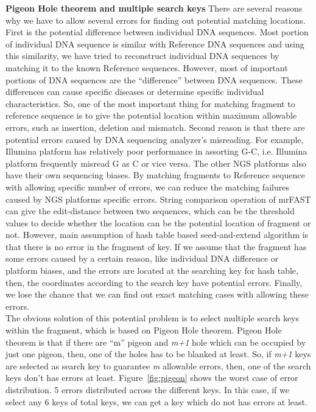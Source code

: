 \textbf{Pigeon Hole theorem and multiple search keys} There are several reasons
why we have to allow several errors for finding out potential matching
locations. First is the potential difference between individual DNA sequences.
Most portion of individual DNA sequence is similar with Reference DNA sequences
and using this similarity, we have tried to reconstruct individual DNA
sequences by matching it to the known Reference sequences. However, most of
important portions of DNA sequences are the “difference” between DNA sequences.
These differences can cause specific diseases or determine specific individual
characteristics. So, one of the most important thing for matching fragment to
reference sequence is to give the potential location within maximum allowable
errors, such as insertion, deletion and mismatch. Second reason is that there
are potential errors caused by DNA sequencing analyzer’s misreading. For
example, Illumina platform has relatively poor performance in assorting G-C,
i.e. Illumina platform frequently misread G as C or vice versa. The other NGS
platforms also have their own sequencing biases. By matching fragments to
Reference sequence with allowing specific number of errors, we can reduce the
matching failures caused by NGS platforms specific errors.  String comparison
operation of mrFAST can give the edit-distance between two sequences, which can
be the threshold values to decide whether the location can be the potential
location of fragment or not.  However, main assumption of hash table based
seed-and-extend algorithm is that there is no error in the fragment of key. If
we assume that the fragment has some errors caused by a certain reason, like
individual DNA difference or platform biases, and the errors are located at the
searching key for hash table, then, the coordinates according to the search key
have potential errors.  Finally, we lose the chance that we can find out exact
matching cases with allowing these errors.\\

The obvious solution of this potential problem is to select multiple search
keys within the fragment, which is based on Pigeon Hole theorem. Pigeon Hole
theorem is that if there are “m” pigeon and \textit{m+1} hole which can be
occupied by just one pigeon, then, one of the holes has to be blanked at least.
So, if \textit{m+1} keys are selected as search key to guarantee \textit{m}
allowable errors, then, one of the search keys don’t has errors at least.
Figure~\ref{fig:pigeon} shows the worst case of error distribution. 5 errors
distributed across the different keys. In this case, if we select any 6 keys of
total keys, we can get a key which do not has errors at least. 

